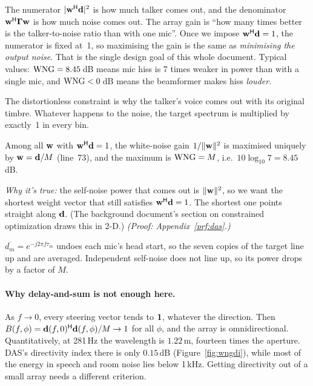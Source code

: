 \documentclass[11pt]{article}
\begin{document}
\begin{inplainwords}
The numerator $|\mathbf{w}^{\mathsf H}\mathbf{d}|^2$ is how much talker comes out, and the denominator
$\mathbf{w}^{\mathsf H}\bm{\Gamma}\mathbf{w}$ is how much noise comes out. The array gain is ``how many times better is the
talker-to-noise ratio than with one mic''. Once we impose $\mathbf{w}^{\mathsf H}\mathbf{d}=1$, the numerator is
fixed at~1, so maximising the gain is the same as \emph{minimising the output noise}. That is the
single design goal of this whole document. Typical values: $\mathrm{WNG}=8.45$\,dB means mic hiss is
7 times weaker in power than with a single mic, and $\mathrm{WNG}<0$\,dB means the beamformer makes hiss
\emph{louder}.
\end{inplainwords}

The distortionless constraint is why the talker's voice comes out with its original timbre.
Whatever happens to the noise, the target spectrum is multiplied by exactly~1 in every bin.


\begin{proposition}\label{prop:das}
Among all $\mathbf{w}$ with $\mathbf{w}^{\mathsf H}\mathbf{d}=1$, the white-noise gain $1/\|\mathbf{w}\|^2$ is maximised uniquely by
$\mathbf{w}=\mathbf{d}/M$ (line~73), and the maximum is $\mathrm{WNG}=M$, i.e.\ $10\log_{10}7=8.45$\,dB.
\end{proposition}
\noindent\emph{Why it's true:} the self-noise power that comes out is $\|\mathbf{w}\|^2$, so we want the
shortest weight vector that still satisfies $\mathbf{w}^{\mathsf H}\mathbf{d}=1$. The shortest one points straight
along $\mathbf{d}$. (The background document's section on constrained optimization draws this in 2-D.)
\emph{(Proof: Appendix~\ref{prf:das}.)}

\begin{intuition}
$\overline{d_m}=e^{-j2\pi f\tau_m}$ undoes each mic's head start, so the seven copies of the
target line up and are averaged. Independent self-noise does not line up, so its power drops
by a factor of $M$.
\end{intuition}

\paragraph{Why delay-and-sum is not enough here.}
As $f\to0$, every steering vector tends to $\mathbf{1}$, whatever the direction. Then
$B(f,\phi)=\mathbf{d}(f,0)^{\mathsf H}\mathbf{d}(f,\phi)/M\to1$ for all $\phi$, and the array is omnidirectional.
Quantitatively, at 281\,Hz the wavelength is $1.22$\,m, fourteen times the aperture.
DAS's directivity index there is only $0.15$\,dB (Figure~\ref{fig:wngdi}), while most of the
energy in speech and room noise lies below 1\,kHz. Getting directivity out of a small array
needs a different criterion.
\end{document}
